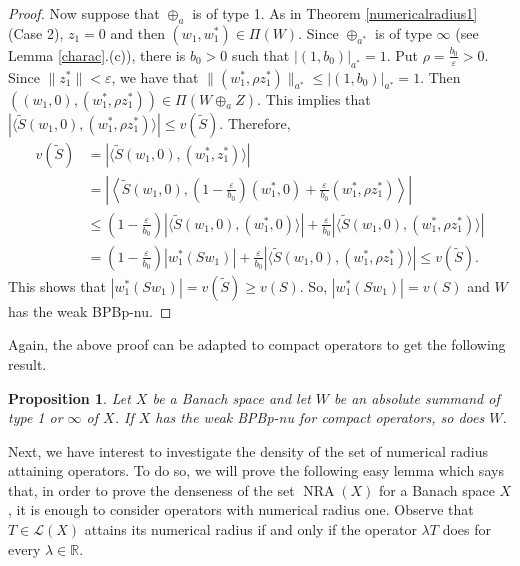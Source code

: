 \documentclass[10pt,a4paper]{amsart}
\theoremstyle{plain}
\newtheorem{prop}[theorem]{Proposition}
\theoremstyle{definition}
\newcommand{\R}{\mathbb{R}}
\newcommand{\eps}{\varepsilon}
\DeclareMathOperator{\NRA}{NRA}
\renewcommand{\leq}{\leqslant}
\renewcommand{\geq}{\geqslant}
\begin{document}
\begin{proof}
Now suppose that $\oplus_a$ is of type 1. As in Theorem \ref{numericalradius1} (Case 2), $z_1 = 0$ and then $(w_1, w_1^*) \in \Pi(W)$. Since $\oplus_{a^*}$ is of type $\infty$ (see Lemma \ref{charac}.(c)), there is $b_0 > 0$ such that $|(1, b_0)|_{a^*} = 1$. Put $\rho = \frac{b_0}{\eps} > 0$. Since $\|z_1^*\| < \eps$, we have that $\|(w_1^*, \rho z_1^*)\|_{a^*} \leq |(1, b_0)|_{a^*} = 1$. Then $((w_1, 0), (w_1^*, \rho z_1^*)) \in \Pi(W \oplus_a Z)$. This implies that $|\langle \widetilde{S}(w_1, 0), (w_1^*, \rho z_1^*) \rangle | \leq v(\widetilde{S})$. Therefore,
\begin{align*}
v(\widetilde{S}) &= | \langle \widetilde{S} (w_1, 0), (w_1^*, z_1^*) \rangle| \\
&= \left| \left \langle \widetilde{S}(w_1, 0), \left( 1 - \frac{\eps}{b_0} \right) (w_1^*, 0) + \frac{\eps}{b_0} (w_1^*, \rho z_1^*) \right \rangle \right| \\
&\leq \left(1 - \frac{\eps}{b_0} \right) | \langle  \widetilde{S}(w_1, 0), (w_1^*, 0) \rangle| + \frac{\eps}{b_0} | \langle \widetilde{S}(w_1, 0), (w_1^*, \rho z_1^* ) \rangle | \\
&= \left(1 - \frac{\eps}{b_0} \right) | w_1^*(Sw_1)| + \frac{\eps}{b_0} | \langle \widetilde{S}(w_1, 0), (w_1^*, \rho z_1^* ) \rangle | \leq v(\widetilde{S}).
\end{align*} 	
This shows that $|w_1^*(Sw_1)| = v(\widetilde{S}) \geq v(S)$. So, $|w_1^*(Sw_1)| = v(S)$ and $W$ has the weak BPBp-nu.	
\end{proof}


Again, the above proof can be adapted to compact operators to get the following result.

\begin{prop} Let $X$ be a Banach space and let $W$ be an absolute summand of type 1 or $\infty$ of $X$. If $X$ has the weak BPBp-nu for compact operators, so does $W$.	
\end{prop}



Next, we have interest to investigate the density of the set of numerical radius attaining operators. To do so, we will prove the following easy lemma which says that, in order to prove the denseness of the set $\NRA(X)$ for a Banach space $X$, it is enough to consider operators with numerical radius one. Observe that $T \in \mathcal{L}(X)$ attains its numerical radius if and only if the operator $\lambda T$ does for every $\lambda \in \R$.
\end{document}
